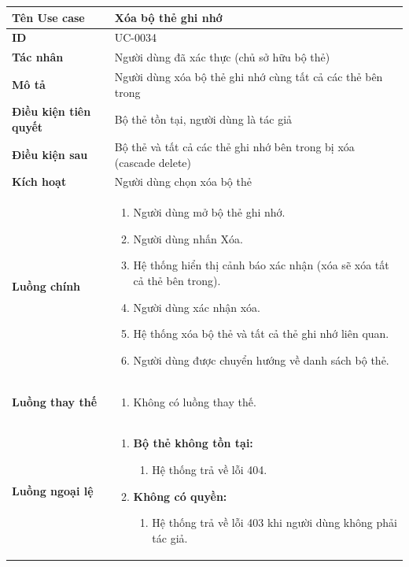 {
\renewcommand{\arraystretch}{1.5}

\begin{tabularx}{\textwidth}{|>{\raggedright\arraybackslash}X|>{\raggedright\arraybackslash}X|}
\hline
\textbf{Tên Use case} & Xóa bộ thẻ ghi nhớ \\
\hline
\textbf{ID} & UC-0034 \\
\hline
\textbf{Tác nhân} & Người dùng đã xác thực (chủ sở hữu bộ thẻ) \\
\hline
\textbf{Mô tả} & Người dùng xóa bộ thẻ ghi nhớ cùng tất cả các thẻ bên trong \\
\hline
\textbf{Điều kiện tiên quyết} & Bộ thẻ tồn tại, người dùng là tác giả \\
\hline
\textbf{Điều kiện sau} & Bộ thẻ và tất cả các thẻ ghi nhớ bên trong bị xóa (cascade delete) \\
\hline
\textbf{Kích hoạt} & Người dùng chọn xóa bộ thẻ \\
\hline
\textbf{Luồng chính} &
\begin{enumerate}
    \item Người dùng mở bộ thẻ ghi nhớ.
    \item Người dùng nhấn Xóa.
    \item Hệ thống hiển thị cảnh báo xác nhận (xóa sẽ xóa tất cả thẻ bên trong).
    \item Người dùng xác nhận xóa.
    \item Hệ thống xóa bộ thẻ và tất cả thẻ ghi nhớ liên quan.
    \item Người dùng được chuyển hướng về danh sách bộ thẻ.
\end{enumerate} \\
\hline
\textbf{Luồng thay thế} &
\begin{enumerate}
    \item Không có luồng thay thế.
\end{enumerate} \\
\hline
\textbf{Luồng ngoại lệ} &
\begin{enumerate}
    \item \textbf{Bộ thẻ không tồn tại:}
    \begin{enumerate}
        \item[1Err.] Hệ thống trả về lỗi 404.
    \end{enumerate}
    \item \textbf{Không có quyền:}
    \begin{enumerate}
        \item[1Err2.] Hệ thống trả về lỗi 403 khi người dùng không phải tác giả.
    \end{enumerate}
\end{enumerate} \\
\hline
\end{tabularx}
}
